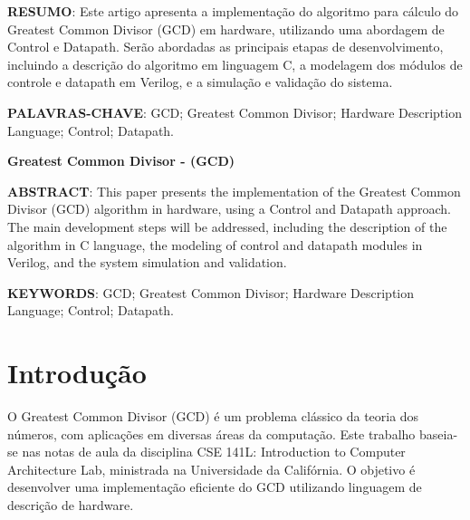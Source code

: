 \documentclass[a4paper,11pt]{article} %
\begin{document}


\begin{center}
    \tableofcontents %
\end{center}

\newpage


\vspace{0.5cm}
\noindent\textbf{RESUMO}: 
Este artigo apresenta a implementação do algoritmo para cálculo do 
Greatest Common Divisor (GCD) em hardware, 
utilizando uma abordagem de Control e Datapath. 
Serão abordadas as principais etapas de desenvolvimento, 
incluindo a descrição do algoritmo em linguagem C, 
a modelagem dos módulos de controle e datapath em Verilog, 
e a simulação e validação do sistema.

\vspace{0.5cm}
\noindent\textbf{PALAVRAS-CHAVE}: 
GCD; Greatest Common Divisor; Hardware Description Language; Control; Datapath.

\vspace{0.5cm}
 \begin{center}
 \textbf{Greatest Common Divisor - (GCD)}
 \end{center}

\noindent\textbf{ABSTRACT}: 
This paper presents the implementation of the Greatest Common Divisor (GCD) 
algorithm in hardware, using a Control and Datapath approach. 
The main development steps will be addressed, 
including the description of the algorithm in C language, 
the modeling of control and datapath modules in Verilog, 
and the system simulation and validation.

\vspace{0.5cm}
\noindent\textbf{KEYWORDS}: GCD; Greatest Common Divisor; Hardware Description Language; Control; Datapath.

\section{Introdução}

O Greatest Common Divisor (GCD) é um problema clássico da teoria dos números, 
com aplicações em diversas áreas da computação. 
Este trabalho baseia-se nas notas de aula da disciplina CSE 141L: 
Introduction to Computer Architecture Lab, 
ministrada na Universidade da Califórnia. 
O objetivo é desenvolver uma implementação eficiente do GCD 
utilizando linguagem de descrição de hardware.
\end{document}
